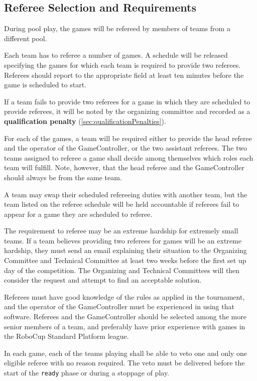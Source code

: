 \subsection{Referee Selection and Requirements}
\label{sec:refSelection}

During pool play, the games will be refereed by members of teams from a different pool.

Each team has to referee a number of games.
A schedule will be released specifying the games for which each team is required to provide two referees.
Referees should report to the appropriate field at least ten minutes before the game is scheduled to start.

If a team fails to provide two referees for a game in which they are scheduled to provide referees, it will be noted by the organizing committee and recorded as a \textbf{qualification penalty} (\cref{sec:qualificationPenalties}).

For each of the games, a team will be required either to provide the head referee and the operator of the GameController, or the two assistant referees.
The two teams assigned to referee a game shall decide among themselves which roles each team will fulfill.
Note, however, that the head referee and the GameController should always be from the same team.

A team may swap their scheduled refereeing duties with another team, but the team listed on the referee schedule will be held accountable if referees fail to appear for a game they are scheduled to referee.

The requirement to referee may be an extreme hardship for extremely small teams.
If a team believes providing two referees for games will be an extreme hardship, they must send an email explaining their situation to the Organizing Committee and Technical Committee at least two weeks before the first set up day of the competition.
The Organizing and Technical Committees will then consider the request and attempt to find an acceptable solution.

Referees must have good knowledge of the rules as applied in the tournament, and the operator of the GameController must be experienced in using that software.
Referees and the GameController should be selected among the more senior members of a team, and preferably have prior experience with games in the RoboCup Standard Platform league.

In each game, each of the teams playing shall be able to veto one and only one eligible referee with no reason required.
The veto must be delivered before the start of the \texttt{ready} phase or during a stoppage of play.

